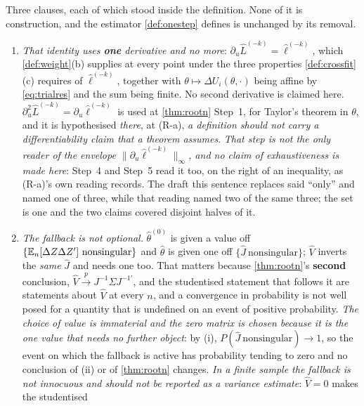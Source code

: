 \begin{remark}\label{rem:onestepread}
Three clauses, each of which stood inside the definition. None of it is construction, and the
estimator \cref{def:onestep} defines is unchanged by its removal.
\begin{enumerate}
\item[(1)] \emph{That identity uses \textbf{one} derivative and no more}:
$\partial_u\hat L^{(-k)}=\hat\ell^{(-k)}$, which \cref{def:weight}(b) supplies at every point under the three
properties \cref{def:crossfit}(c) requires of $\hat\ell^{(-k)}$, together with $\theta\mapsto\Delta U_i(\theta,\cdot)$
being affine by \eqref{eq:trialres} and the sum being finite. No second derivative is claimed here.
$\partial_u^{2}\hat L^{(-k)}=\partial_u\hat\ell^{(-k)}$ is used at \cref{thm:rootn} Step~1, for Taylor's
theorem in $\theta$, and it is hypothesised \emph{there}, at (R-a), \emph{a definition should not carry a
differentiability claim that a theorem assumes}. \emph{That step is not the only reader of the
envelope $\|\partial_u\hat\ell^{(-k)}\|_\infty$, and no claim of exhaustiveness is made here}:
 Step~4 and  Step~5 read it too, on the right of an
inequality, as (R-a)'s own reading records. The draft this sentence replaces said ``only'' and named
one of three, while that reading named two of the same three; the set is one and the two claims
covered disjoint halves of it.
\item[(2)] \emph{The fallback is not optional.} $\hat\theta^{(0)}$ is given a value off $\{\mathbb{E}_n[\Delta Z\Delta Z']\
\text{nonsingular}\}$ and $\hat\theta$ is given one off $\{\hat J\ \text{nonsingular}\}$;
$\hat V$ inverts the \emph{same} $\hat J$ and needs one too. That matters because
\cref{thm:rootn}'s \textbf{second} conclusion, $\hat V\xrightarrow{p}J^{-1}\Sigma J^{-1\prime}$, and the
studentised statement that follows it are statements about $\hat V$ at every $n$, and a convergence in
probability is not well posed for a quantity that is undefined on an event of positive probability.
\emph{The choice of value is immaterial and the zero matrix is chosen because it is the one value that
needs no further object}: by \suppref{Lemma}{sandwich}\textup{(i)}, $P(\hat J\ \text{nonsingular})\to1$, so the
event on which the fallback is active has probability tending to zero and no conclusion of
\suppref{Lemma}{sandwich}\textup{(ii)} or of \cref{thm:rootn} changes. \emph{In a finite sample the fallback is
not innocuous and should not be reported as a variance estimate}: $\hat V=0$ makes the studentised

\end{enumerate}
\end{remark}

